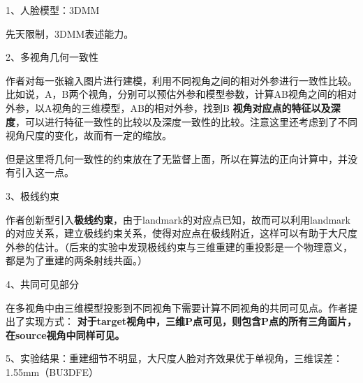 \documentclass[UTF8,12pt]{article} %
\theoremstyle{definition}
\begin{document}
1、人脸模型：3DMM

	先天限制，3DMM表述能力。

2、多视角几何一致性

	作者对每一张输入图片进行建模，利用不同视角之间的相对外参进行一致性比较。比如说，A，B两个视角，分别可以预估外参和模型参数，计算AB视角之间的相对外参，以A视角的三维模型，AB的相对外参，找到B \textbf{视角对应点的特征以及深度}，可以进行特征一致性的比较以及深度一致性的比较。注意这里还考虑到了不同视角尺度的变化，故而有一定的缩放。
	
	但是这里将几何一致性的约束放在了无监督上面，所以在算法的正向计算中，并没有引入这一点。
	
3、极线约束

	作者创新型引入\textbf{极线约束}，由于landmark的对应点已知，故而可以利用landmark的对应关系，建立极线约束关系，使得对应点在极线附近，这样可以有助于大尺度外参的估计。（后来的实验中发现极线约束与三维重建的重投影是一个物理意义，都是为了重建的两条射线共面。）
	
4、共同可见部分

	在多视角中由三维模型投影到不同视角下需要计算不同视角的共同可见点。作者提出了实现方式：
	\textbf{对于target视角中，三维P点可见，则包含P点的所有三角面片，在source视角中同样可见。}
	
5、实验结果：重建细节不明显，大尺度人脸对齐效果优于单视角，三维误差：1.55mm（BU3DFE）
\end{document}
